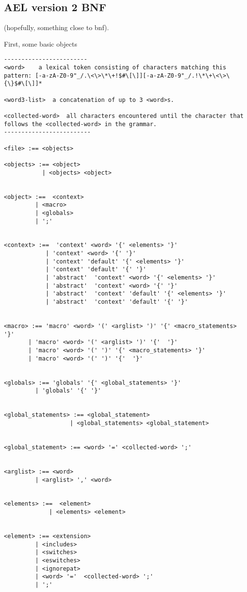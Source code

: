 {\subsection{AEL version 2 BNF}

(hopefully, something close to bnf).

First, some basic objects

\begin{verbatim}
------------------------
<word>    a lexical token consisting of characters matching this pattern: [-a-zA-Z0-9"_/.\<\>\*\+!$#\[\]][-a-zA-Z0-9"_/.!\*\+\<\>\{\}$#\[\]]*

<word3-list>  a concatenation of up to 3 <word>s.

<collected-word>  all characters encountered until the character that follows the <collected-word> in the grammar.
-------------------------

<file> :== <objects>

<objects> :== <object>
           | <objects> <object>


<object> :==  <context>
         | <macro>
         | <globals>
         | ';'


<context> :==  'context' <word> '{' <elements> '}'
            | 'context' <word> '{' '}'
            | 'context' 'default' '{' <elements> '}'
            | 'context' 'default' '{' '}'
            | 'abstract'  'context' <word> '{' <elements> '}'
            | 'abstract'  'context' <word> '{' '}'
            | 'abstract'  'context' 'default' '{' <elements> '}'
            | 'abstract'  'context' 'default' '{' '}'


<macro> :== 'macro' <word> '(' <arglist> ')' '{' <macro_statements> '}'
       | 'macro' <word> '(' <arglist> ')' '{'  '}'
       | 'macro' <word> '(' ')' '{' <macro_statements> '}'
       | 'macro' <word> '(' ')' '{'  '}'


<globals> :== 'globals' '{' <global_statements> '}'
         | 'globals' '{' '}'


<global_statements> :== <global_statement>
                   | <global_statements> <global_statement>


<global_statement> :== <word> '=' <collected-word> ';'


<arglist> :== <word>
         | <arglist> ',' <word>


<elements> :==  <element>
             | <elements> <element>


<element> :== <extension>
         | <includes>
         | <switches>
         | <eswitches>
         | <ignorepat>
         | <word> '='  <collected-word> ';'
         | ';'



\end{verbatim}}
